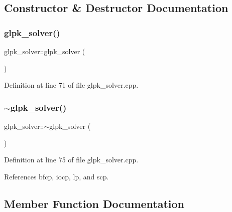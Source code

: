 \subsection{Constructor \& Destructor Documentation}
\mbox{\label{classglpk__solver_aed422ea95479d03b421863fea89972f9}} 
\subsubsection{\texorpdfstring{glpk\+\_\+solver()}{glpk\_solver()}}
{\footnotesize\ttfamily glpk\+\_\+solver\+::glpk\+\_\+solver (\begin{DoxyParamCaption}{ }\end{DoxyParamCaption})}



Definition at line 71 of file glpk\+\_\+solver.\+cpp.

\mbox{\label{classglpk__solver_a6fdba13c6b3d436d4b5c66a3246042bc}} 
\subsubsection{\texorpdfstring{$\sim$glpk\+\_\+solver()}{~glpk\_solver()}}
{\footnotesize\ttfamily glpk\+\_\+solver\+::$\sim$glpk\+\_\+solver (\begin{DoxyParamCaption}{ }\end{DoxyParamCaption})\hspace{0.3cm}{\ttfamily [override]}}



Definition at line 75 of file glpk\+\_\+solver.\+cpp.



References bfcp, iocp, lp, and scp.



\subsection{Member Function Documentation}
\mbox{\label{classglpk__solver_a7f8f325055100b3b9a9d115b5bb2a613}} 
